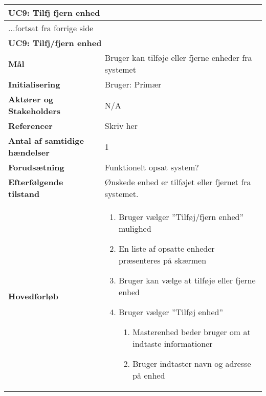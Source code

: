 \begin{center} \centering
	\begin{longtable}{|p{5cm}|p{9cm}|}  %
	\hline
		\multicolumn{2}{|l|}{\textbf{UC9: Tilfj fjern enhed}} \\\hline %
		\endfirsthead
		
		\multicolumn{2}{l}{...fortsat fra forrige side} \\ \hline %
		\multicolumn{2}{|l|}{\textbf{UC9: Tilfj/fjern enhed}} \\\hline %
		\endhead	
		
		\textbf{Mål}								&Bruger kan tilføje eller fjerne enheder fra systemet			\\\hline
		\textbf{Initialisering}					&Bruger: Primær												\\\hline
		\textbf{Aktører og Stakeholders}			&N/A															\\\hline
		\textbf{Referencer}						&Skriv her													\\\hline
		\textbf{Antal af samtidige hændelser}	&1															\\\hline
		\textbf{Forudsætning}					&Funktionelt opsat system?									\\\hline
		\textbf{Efterfølgende tilstand}			&Ønskede enhed er tilføjet eller fjernet fra systemet.		\\\hline
		\textbf{Hovedforløb}					
			&\begin{enumerate}
	
				\item Bruger vælger ''Tilføj/fjern enhed'' mulighed
				
				\item En liste af opsatte enheder præsenteres på skærmen
				
				\item \label{uc9valg} Bruger kan vælge at tilføje eller fjerne enhed
				
				\item Bruger vælger ''Tilføj enhed''
				
				\begin{enumerate}
					\item \label{uc9indtast} Masterenhed beder bruger om at indtaste informationer
					
					\item \label{uc9indtast_fejl} Bruger indtaster navn og adresse på enhed\newline
					

\end{enumerate}
\end{enumerate}
\end{longtable}
\end{center}
